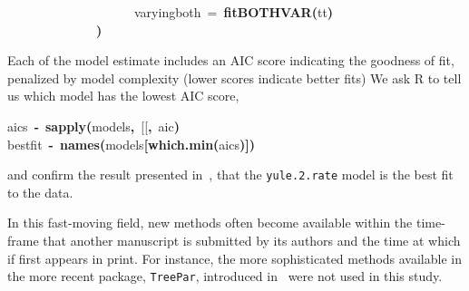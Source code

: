 \documentclass[authoryear, preprint]{elsarticle}
\makeatletter
\newcommand{\hlfunctioncall}[1]{\textcolor[rgb]{.5,0,.33}{\textbf{#1}}}%
\newcommand{\hlstring}[1]{\textcolor[rgb]{.6,.6,1}{#1}}%
\newcommand{\hlkeyword}[1]{\textbf{#1}}%
\newcommand{\hlargument}[1]{\textcolor[rgb]{.69,.25,.02}{#1}}%
\newcommand{\hlassignement}[1]{\textbf{#1}}%
\newcommand{\hlsymbol}[1]{#1}%
\newcommand{\hlstd}[1]{\textcolor[rgb]{0,0,0}{#1}}%
\newenvironment{kframe}{%
 \def\FrameCommand##1{\hskip\@totalleftmargin \hskip-\fboxsep
 \colorbox{shadecolor}{##1}\hskip-\fboxsep
     \hskip-\linewidth \hskip-\@totalleftmargin \hskip\columnwidth}%
 \MakeFramed {\advance\hsize-\width
   \@totalleftmargin\z@ \linewidth\hsize
   \@setminipage}}%
 {\par\unskip\endMakeFramed}
\newenvironment{knitrout}{}{} %
\makeatother
\begin{document}
\begin{knitrout}
\begin{kframe}
\begin{flushleft}
\hlstd{}{\ }{\ }{\ }{\ }{\ }{\ }{\ }{\ }{\ }{\ }{\ }{\ }{\ }{\ }{\ }{\ }{\ }{\ }{\ }{\ }\hlargument{varying\usebox{\hlnormalsizeboxunderscore}both}{\ }\hlargument{=}{\ }\hlfunctioncall{fitBOTHVAR}\hlkeyword{(}\hlsymbol{tt}\hlkeyword{)}\hspace*{\fill}\\
\hlstd{}{\ }{\ }{\ }{\ }{\ }{\ }{\ }{\ }{\ }{\ }{\ }{\ }{\ }{\ }\hlkeyword{)}\mbox{}
\normalfont
\end{flushleft}
\end{kframe}
\end{knitrout}

Each of the model estimate includes an AIC score indicating the goodness of fit, 
penalized by model complexity (lower scores indicate better fits)
We ask R to tell us which model has the lowest AIC score,
\begin{knitrout}
\color{fgcolor}\begin{kframe}
\begin{flushleft}
\ttfamily\noindent
\hlsymbol{aics}{\ }\hlassignement{\usebox{\hlnormalsizeboxlessthan}-}{\ }\hlfunctioncall{sapply}\hlkeyword{(}\hlsymbol{models}\hlkeyword{,}{\ }\hlsymbol{\usebox{\hlnormalsizeboxbacktick}[[\usebox{\hlnormalsizeboxbacktick}}\hlkeyword{,}{\ }\hlstring{\usebox{\hlnormalsizeboxsinglequote}aic\usebox{\hlnormalsizeboxsinglequote}}\hlkeyword{)}\hspace*{\fill}\\
\hlstd{}\hlsymbol{best\usebox{\hlnormalsizeboxunderscore}fit}{\ }\hlassignement{\usebox{\hlnormalsizeboxlessthan}-}{\ }\hlfunctioncall{names}\hlkeyword{(}\hlsymbol{models}\hlkeyword{[}\hlfunctioncall{which.min}\hlkeyword{(}\hlsymbol{aics}\hlkeyword{)}\hlkeyword{]}\hlkeyword{)}\mbox{}
\normalfont
\end{flushleft}
\end{kframe}
\end{knitrout}

and confirm the result presented in~\citet{Derryberry2011}, that the \texttt{yule.2.rate} model is the best fit to the data.  


In this fast-moving field, new methods often become available within the time-frame 
that another manuscript is submitted by its authors and the time at which if first appears in print.  
For instance, the more sophisticated methods available in the more recent package, \texttt{TreePar}, 
introduced in~\citet{Stadler2011} were not used in this study.
\end{document}
